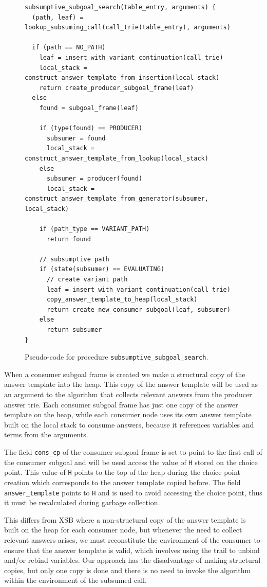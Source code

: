 \begin{figure}[ht]
\begin{Verbatim}
subsumptive_subgoal_search(table_entry, arguments) {
  (path, leaf) = lookup_subsuming_call(call_trie(table_entry), arguments)
  
  if (path == NO_PATH)
    leaf = insert_with_variant_continuation(call_trie)
    local_stack = construct_answer_template_from_insertion(local_stack)
    return create_producer_subgoal_frame(leaf)
  else
    found = subgoal_frame(leaf)
    
    if (type(found) == PRODUCER)
      subsumer = found
      local_stack = construct_answer_template_from_lookup(local_stack)
    else
      subsumer = producer(found)
      local_stack = construct_answer_template_from_generator(subsumer, local_stack)
    
    if (path_type == VARIANT_PATH)
      return found
    
    // subsumptive path
    if (state(subsumer) == EVALUATING)
      // create variant path
      leaf = insert_with_variant_continuation(call_trie)
      copy_answer_template_to_heap(local_stack)
      return create_new_consumer_subgoal(leaf, subsumer)
    else
      return subsumer
}
\end{Verbatim}
\caption{Pseudo-code for procedure \texttt{subsumptive\_subgoal\_search}.}
\label{fig:subsumptive_subgoal_search}
\end{figure}

When a consumer subgoal frame is created we make a structural copy of the answer template
into the heap. This copy of the answer template will be used as an argument
to the algorithm that collects relevant answers from the producer answer trie.
Each consumer subgoal frame has just one copy of the answer template on the heap,
while each consumer node uses its own answer template built on the local stack to
consume answers, because it references variables
and terms from the arguments.

The field \texttt{cons\_cp} of the consumer subgoal frame is set to point to the first call
of the consumer subgoal and will be used access the value of \texttt{H} stored on the choice point.
This value of \texttt{H} points to the top of the heap during the choice point creation which corresponds
to the answer template copied before. The field \texttt{answer\_template} points to \texttt{H}
and is used to avoid accessing the choice point, thus it must be recalculated during garbage collection.

This differs from XSB \cite{Johnson-00} where a non-structural copy of the answer template is built on the heap for each
consumer node, but whenever the need to collect relevant answers arises, we must reconstitute the
environment of the consumer to ensure that the answer template is valid, which involves using the trail
to unbind and/or rebind variables. Our approach has the disadvantage of making structural copies,
but only one copy is done and there is no need to invoke the algorithm
within the environment of the subsumed call.

